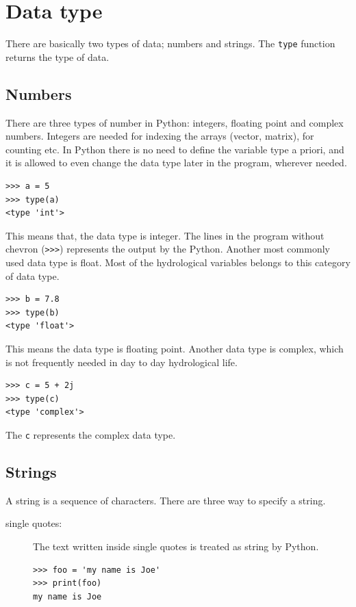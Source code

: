 \documentclass[10pt]{book}
\begin{document}
{\section{Data type}
There are basically two types of data; numbers and strings. The \verb"type" function returns the type of data.

\subsection{Numbers}
There are three types of number in Python: integers, floating point and complex numbers. Integers are needed for indexing the arrays (vector, matrix), for counting etc. In Python there is no need to define the variable type a priori, and it is allowed to even change the data type later in the program, wherever needed. 
\beforeverb \begin{verbatim}
>>> a = 5
>>> type(a)
<type 'int'>
\end{verbatim} \afterverb

This means that, the data type is integer. The lines in the program without chevron (\verb">>>") represents the output by the Python. Another most commonly used data type is float. Most of the hydrological variables belongs to this category of data type. 
\beforeverb
\begin{verbatim}
>>> b = 7.8
>>> type(b)
<type 'float'>
\end{verbatim}
\afterverb
This means the data type is floating point. Another data type is complex, which is not frequently needed in day to day hydrological life. 
\beforeverb
\begin{verbatim}
>>> c = 5 + 2j
>>> type(c)
<type 'complex'>
\end{verbatim}
\afterverb
The {\tt c} represents the complex data type.

\subsection{Strings}
A string is a sequence of characters. There are three way to specify a string.

\begin{description}
\item[single quotes:] The text written inside single quotes is treated as string by Python. 
\beforeverb
\begin{verbatim}
>>> foo = 'my name is Joe'
>>> print(foo)
my name is Joe
\end{verbatim}
\afterverb


\end{description}}
\end{document}
